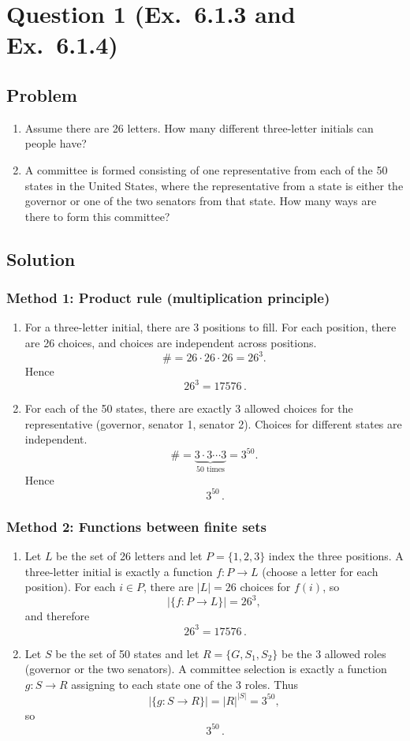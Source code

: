 \documentclass[12pt]{article}
\begin{document}
\newpage
\section{Question 1 (Ex.\ 6.1.3 and Ex.\ 6.1.4)}
\subsection{Problem}
\begin{enumerate}[label=(\alph*)]
\item Assume there are 26 letters. How many different three-letter initials can people have?
\item A committee is formed consisting of one representative from each of the 50 states in the United States, where the representative from a state is either the governor or one of the two senators from that state. How many ways are there to form this committee?
\end{enumerate}

\subsection{Solution}

\subsubsection{Method 1: Product rule (multiplication principle)}
\begin{enumerate}[label=(\alph*)]
\item For a three-letter initial, there are 3 positions to fill. For each position, there are 26 choices, and choices are independent across positions.
\[
\# = 26\cdot 26\cdot 26 = 26^3.
\]
Hence
\[
\boxed{\,26^3 = 17576\,}.
\]

\item For each of the 50 states, there are exactly 3 allowed choices for the representative (governor, senator 1, senator 2). Choices for different states are independent.
\[
\# = \underbrace{3\cdot 3\cdots 3}_{50\text{ times}} = 3^{50}.
\]
Hence
\[
\boxed{\,3^{50}\,}.
\]
\end{enumerate}

\subsubsection{Method 2: Functions between finite sets}
\begin{enumerate}[label=(\alph*)]
\item Let $L$ be the set of 26 letters and let $P=\{1,2,3\}$ index the three positions. A three-letter initial is exactly a function $f:P\to L$ (choose a letter for each position).
For each $i\in P$, there are $|L|=26$ choices for $f(i)$, so
\[
|\{f:P\to L\}| = 26^3,
\]
and therefore
\[
\boxed{\,26^3 = 17576\,}.
\]

\item Let $S$ be the set of 50 states and let $R=\{G,S_1,S_2\}$ be the 3 allowed roles (governor or the two senators). A committee selection is exactly a function $g:S\to R$ assigning to each state one of the 3 roles.
Thus
\[
|\{g:S\to R\}| = |R|^{|S|} = 3^{50},
\]
so
\[
\boxed{\,3^{50}\,}.
\]
\end{enumerate}
\end{document}
